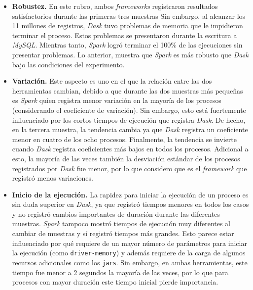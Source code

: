 \begin{itemize}
	
	\item \textbf{Robustez.} En este rubro, ambos \textit{frameworks} registraron resultados satisfactorios durante las primeras tres muestras Sin embargo, al alcanzar los 11 millones de registros, \textit{Dask} tuvo problemas de memoria que le impidieron terminar el proceso. Estos problemas se presentaron durante la escritura a \textit{MySQL}. Mientras tanto, \textit{Spark} logró terminar el 100\% de las ejecuciones sin presentar problemas. Lo anterior, muestra que \textit{Spark} es más robusto que \textit{Dask} bajo las condiciones del experimento.
	
	\item \textbf{Variación.} Este aspecto es uno en el que la relación entre las dos herramientas cambian, debido a que durante las dos muestras más pequeñas es \textit{Spark} quien registra menor variación en la mayoría de los procesos (considerando el coeficiente de variación). Sin embargo, esto está fuertemente influenciado por los cortos tiempos de ejecución que registra \textit{Dask}. De hecho, en la tercera muestra, la tendencia cambia ya que \textit{Dask} registra un coeficiente menor en cuatro de los ocho procesos. Finalmente, la tendencia se invierte cuando \textit{Dask} registra coeficientes más bajos en todos los procesos. Adicional a esto, la mayoría de las veces también la desviación estándar de los procesos registrados por \textit{Dask} fue menor, por lo que considero que es el \textit{framework} que registró menos variaciones.
	
	\item \textbf{Inicio de la ejecución.} La rapidez para iniciar la ejecución de un proceso es sin duda superior en \textit{Dask}, ya que registró tiempos menores en todos los casos y no registró cambios importantes de duración durante las diferentes muestras. \textit{Spark} tampoco mostró tiempos de ejecución muy diferentes al cambiar de muestras y sí registró tiempos más grandes. Esto parece estar influenciado por qué requiere de un mayor número de parámetros para iniciar la ejecución (como \texttt{driver-memory}) y además requiere de la carga de algunos recursos adicionales como los \texttt{jars}. Sin embargo, en ambas herramientas, este tiempo fue menor a 2 segundos la mayoría de las veces, por lo que para procesos con mayor duración este tiempo inicial pierde importancia.
	

\end{itemize}
